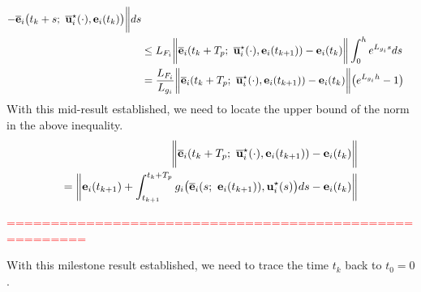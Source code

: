 \begin{bw_box}
\begin{align}
      - \overline{\vect{e}}_i\big(t_k + s;\ \overline{\vect{u}}_i^{\star}(\cdot), \vect{e}_i(t_k)\big) \bigg\| d s \\
    &\leq L_{F_i}\bigg\| \overline{\vect{e}}_i(t_k + T_p;\ \overline{\vect{u}}_i^{\star}(\cdot), \vect{e}_i(t_{k+1})) - \vect{e}_i(t_k) \bigg\|
      \int_0^h e^{L_{g_i}s} ds \\
    &= \dfrac{L_{F_i}}{L_{g_i}}\bigg\| \overline{\vect{e}}_i(t_k + T_p;\ \overline{\vect{u}}_i^{\star}(\cdot), \vect{e}_i(t_{k+1})) - \vect{e}_i(t_k) \bigg\|
      \big(e^{L_{g_i}h}-1\big)
  \label{eq:delta_F_mid_result}
  \end{align}
  With this mid-result established, we need to locate the upper bound of the
  norm in the above inequality.
  \begin{align}
    \bigg\| \overline{\vect{e}}_i(t_k + T_p;\ \overline{\vect{u}}_i^{\star}(\cdot), \vect{e}_i(t_{k+1})) - \vect{e}_i(t_k) \bigg\| \\
    = \bigg\| \vect{e}_i(t_{k+1})
  +\int_{t_{k+1}}^{t_k + T_p} g_i \big(\overline{\vect{e}}_i(s;\ \vect{e}_i(t_{k+1})), \vect{u}_i^{\star}(s)\big)ds
    - \vect{e}_i(t_k) \bigg\|
  \end{align}


\end{bw_box}





























\textcolor{red}{=======================================================}

With this milestone result established, we need to trace the time $t_k$ back
to $t_0 = 0$.

